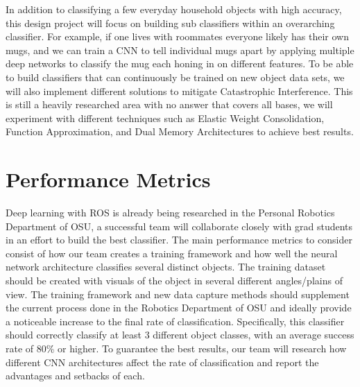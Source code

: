 \documentclass[a4paper, 10pt]{article}
\begin{document}
In addition to classifying a few everyday household objects with high accuracy, this design project will focus on building sub classifiers within an overarching classifier. For example, if one lives with roommates everyone likely has their own mugs, and we can train a CNN to tell individual mugs apart by applying multiple deep networks to classify the mug each honing in on different features. To be able to build classifiers that can continuously be trained on new object data sets, we will also implement different solutions to mitigate Catastrophic Interference. This is still a heavily researched area with no answer that covers all bases, we will experiment with different techniques such as Elastic Weight Consolidation, Function Approximation, and Dual Memory Architectures to achieve best results.

\section{Performance Metrics}
Deep learning with ROS is already being researched in the Personal Robotics Department of OSU, a successful team will collaborate closely with grad students in an effort to build the best classifier. The main performance metrics to consider consist of how our team creates a training framework and how well the neural network architecture classifies several distinct objects. The training dataset should be created with visuals of the object in several different angles/plains of view. The training framework and new data capture methods should supplement the current process done in the Robotics Department of OSU and ideally provide a noticeable increase to the final rate of classification. Specifically, this classifier should correctly classify at least 3 different object classes, with an average success rate of 80\% or higher. To guarantee the best results, our team will research how different CNN architectures affect the rate of classification and report the advantages and setbacks of each.
\end{document}
